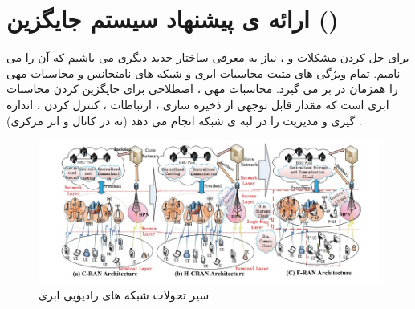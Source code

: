 \section{ارائه ی پیشنهاد سیستم جایگزین ()}
برای حل کردن مشکلات  و ، نیاز به معرفی ساختار جدید دیگری می باشیم که آن را  می نامیم.
 تمام ویژگی های مثبت محاسبات ابری و شبکه های نامتجانس و محاسبات مهی را همزمان در بر می گیرد.
محاسبات مهی ، اصطلاحی برای جایگزین کردن محاسبات ابری است که مقدار قابل توجهی از ذخیره سازی ، ارتباطات ، کنترل کردن ، اندازه گیری و مدیریت را در لبه ی شبکه انجام می دهد (نه در کانال و ابر مرکزی) \cite{fogComputing, fogEdge,fog12}.
\begin{figure}
  \centering
    \includegraphics[scale = 0.7]{./pic1/fhc}
  \caption{ سیر تحولات شبکه های رادیویی ابری \cite{fogComputing}}
  \label{fig:fhc}
\end{figure}
